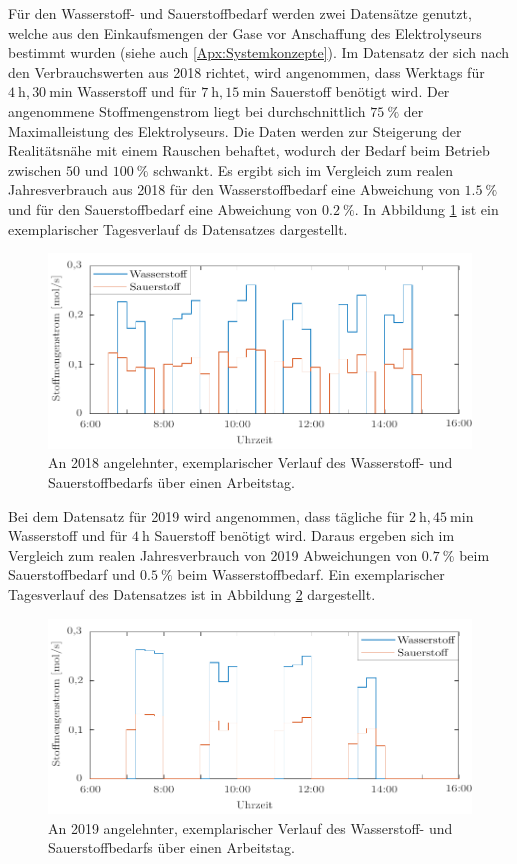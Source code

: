Für den Wasserstoff- und Sauerstoffbedarf werden zwei Datensätze genutzt, welche aus den Einkaufsmengen der Gase vor Anschaffung des Elektrolyseurs bestimmt wurden (siehe auch \ref{Apx:Systemkonzepte}). Im Datensatz der sich nach den Verbrauchswerten aus 2018 richtet, wird angenommen, dass Werktags für $\SI{4}{\hour},\SI{30}{\minute}$ Wasserstoff und für $\SI{7}{\hour},\SI{15}{\minute}$ Sauerstoff benötigt wird. Der angenommene Stoffmengenstrom liegt bei durchschnittlich $\SI{75}{\%}$ der Maximalleistung des Elektrolyseurs. Die Daten werden zur Steigerung der Realitätsnähe mit einem Rauschen behaftet, wodurch der Bedarf beim Betrieb zwischen $50$ und $\SI{100}{\%}$ schwankt. Es ergibt sich im Vergleich zum realen Jahresverbrauch aus 2018 für den Wasserstoffbedarf eine Abweichung von $\SI{1,5}{\%}$ und für den Sauerstoffbedarf eine Abweichung von $\SI{0,2}{\%}$. In Abbildung \ref{fig:Daten1} ist ein exemplarischer Tagesverlauf ds Datensatzes dargestellt. 

\begin{figure}[h]
	\centering
		\includegraphics[scale=1]{Figures/Datensatz1molar}
		\caption{An 2018 angelehnter, exemplarischer Verlauf des Wasserstoff- und Sauerstoffbedarfs über einen Arbeitstag.}	
\label{fig:Daten1}	
\end{figure}

Bei dem Datensatz für 2019 wird angenommen, dass tägliche für $\SI{2}{\hour},\SI{45}{\minute}$ Wasserstoff und für $\SI{4}{\hour}$ Sauerstoff benötigt wird. Daraus ergeben sich im Vergleich zum realen Jahresverbrauch von 2019 Abweichungen von $\SI{0,7}{\%}$ beim Sauerstoffbedarf und $\SI{0,5}{\%}$ beim Wasserstoffbedarf. Ein exemplarischer Tagesverlauf des Datensatzes ist in Abbildung \ref{fig:Daten2} dargestellt.

\begin{figure}[h]
	\centering
		\includegraphics[scale=1]{Figures/Datensatz2molar}
		\caption{An 2019 angelehnter, exemplarischer Verlauf des Wasserstoff- und Sauerstoffbedarfs über einen Arbeitstag.}		
\label{fig:Daten2}	
\end{figure}